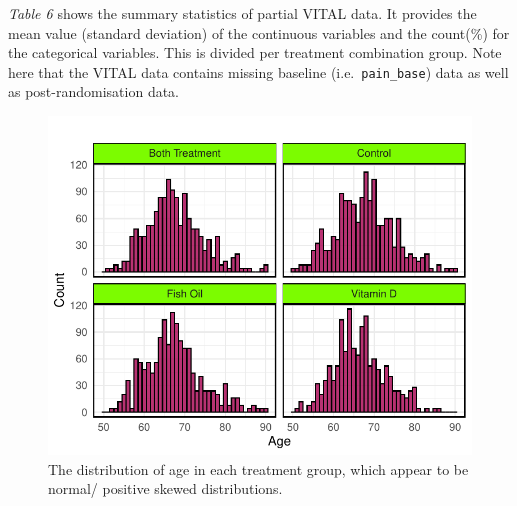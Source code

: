 \documentclass{article}
\begin{document}
\emph{Table 6} shows the summary statistics of partial VITAL data. It
provides the mean value (standard deviation) of the continuous variables
and the count(\%) for the categorical variables. This is divided per
treatment combination group. Note here that the VITAL data contains
missing baseline (i.e.~\texttt{pain\_base}) data as well as
post-randomisation data.

\begin{figure}

{\centering \includegraphics{Final_Report_files/figure-latex/unnamed-chunk-14-1} 

}

\caption{The distribution of age in each treatment group, which appear to be normal/ positive skewed distributions.}\label{fig:unnamed-chunk-14}
\end{figure}
\end{document}
